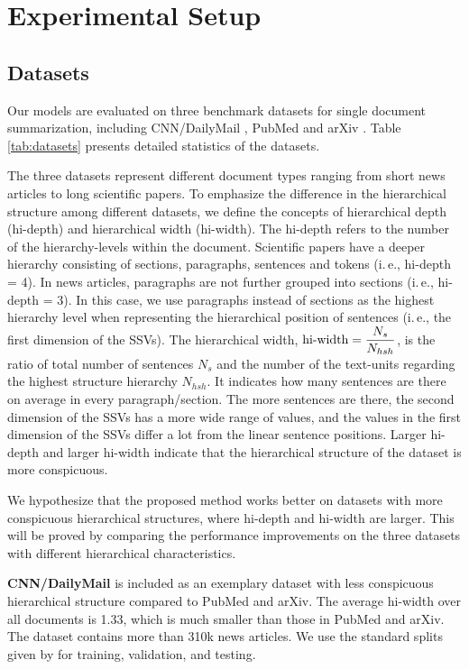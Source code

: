 \documentclass[11pt]{article}
\begin{document}
\section{Experimental Setup}
\label{sec:Experiments}
\subsection{Datasets}
\label{subsec:datasets}

Our models are evaluated on three benchmark datasets for single document summarization, including CNN/DailyMail \cite{cnndm}, PubMed and arXiv \cite{pubmed}. Table \ref{tab:datasets} presents detailed statistics of the datasets.


The three datasets represent different document types ranging from short news articles to long scientific papers. To emphasize the difference in the hierarchical structure among different datasets, we define the concepts of hierarchical depth (hi-depth) and hierarchical width (hi-width). The hi-depth refers to the number of the hierarchy-levels within the document. Scientific papers have a deeper hierarchy consisting of sections, paragraphs, sentences and tokens (i.\,e., hi-depth = 4). In news articles, paragraphs are not further grouped into sections (i.\,e., hi-depth = 3). In this case, we use paragraphs instead of sections as the highest hierarchy level when representing the hierarchical position of sentences (i.\,e.,  the first dimension of the SSVs).
The hierarchical width, $\textnormal{hi-width} = {\dfrac{N_s} {N_{hsh}}}$, is the ratio of total number of sentences $N_s$ and the number of the text-units regarding the highest structure hierarchy $N_{hsh}$. 
It indicates how many sentences are there on average in every paragraph/section. The more sentences are there, the second dimension of the SSVs has a more wide range of values, and the values in the first dimension of the SSVs differ a lot from the linear sentence positions. Larger hi-depth and larger hi-width indicate that the hierarchical structure of the dataset is more conspicuous.

We hypothesize that the proposed method works better on datasets with more conspicuous hierarchical structures, where hi-depth and hi-width are larger. This will be proved by comparing the performance improvements on the three datasets with different hierarchical characteristics. 

\textbf{CNN/DailyMail} is included as an exemplary dataset with less conspicuous hierarchical structure compared to PubMed and arXiv. The average hi-width over all documents is 1.33, which is much smaller than those in PubMed and arXiv. The dataset contains more than 310k news articles. We use the standard splits given by \citet{cnndm} for training, validation, and testing. 
\end{document}
